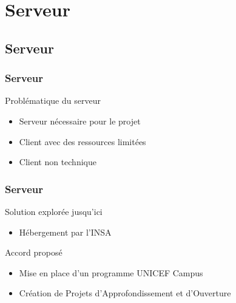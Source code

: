 

\speaker{\Matthieu}
\section{Serveur}
\subsection{Serveur}

\begin{frame}
	\frametitle{Serveur}
	\begin{block}{Problématique du serveur}
      \begin{itemize}
        \item Serveur nécessaire pour le projet
        \item Client avec des ressources limitées
        \item Client non technique
      \end{itemize}
     \end{block}
\end{frame}

\begin{frame}
	\frametitle{Serveur}
	\begin{block}{Solution explorée jusqu'ici}
	\begin{itemize}	
    \item Hébergement par l'INSA
    \end{itemize}
	\end{block}
    
    \begin{block}{Accord proposé}
	\begin{itemize}
		\item Mise en place d'un programme UNICEF Campus
		\item Création de Projets d’Approfondissement et d’Ouverture  %
	\end{itemize}
	\end{block}
\end{frame}

